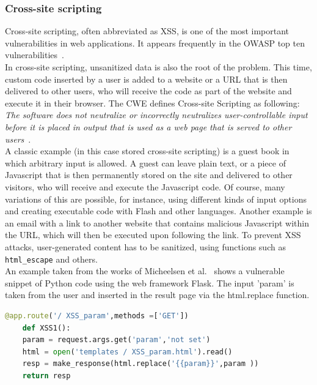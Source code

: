 \documentclass[
a4paper,
pagesize,
pdftex,
12pt,
ngerman,
fleqn,
final,
]{scrartcl}
\begin{document}
	\subsubsection{Cross-site scripting}
	Cross-site scripting, often abbreviated as XSS, is one of the most important vulnerabilities in web applications. It appears frequently in the OWASP top ten vulnerabilities~\cite{OWASPFoundation.}.\\
	In cross-site scripting, unsanitized data is also the root of the problem. This time, custom code inserted by a user is added to a website or a URL that is then delivered to other users, who will receive the code as part of the website and execute it in their browser. The CWE defines Cross-site Scripting as following: \textit{The software does not neutralize or incorrectly neutralizes user-controllable input before it is placed in output that is used as a web page that is served to other users}~\cite{CommonWeaknessEnumeration.19.09.2019}.\\
	A classic example (in this case stored cross-site scripting) is a guest book in which arbitrary input is allowed. A guest can leave plain text, or a piece of Javascript that is then permanently stored on the site and delivered to other visitors, who will receive and execute the Javascript code. Of course, many variations of this are possible, for instance, using different kinds of input options and creating executable code with Flash and other languages. Another example is an email with a link to another website that contains malicious Javascript within the URL, which will then be executed upon following the link. 
	To prevent XSS attacks, user-generated content has to be sanitized, using functions such as \texttt{html\_escape} and others.\\
	An example taken from the works of Micheelsen et al.~\cite{Micheelsen.2016} shows a vulnerable snippet of Python code using the web framework Flask. The input 'param' is taken from the user and inserted in the result page via the html.replace function.
	\begin{lstlisting}[language=Python, showstringspaces=False]
	@app.route('/ XSS_param',methods =['GET'])
	def XSS1():
	param = request.args.get('param','not set')
	html = open('templates / XSS_param.html').read()
	resp = make_response(html.replace('{{param}}',param ))
	return resp
	\end{lstlisting}
	
	
\end{document}
